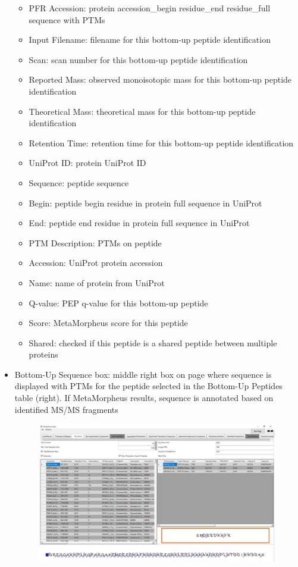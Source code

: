 \begin{itemize}
\begin{figure}[h]
\end{figure}
	\begin{itemize}
		\item PFR Accession: protein accession\_begin residue\_end residue\_full sequence with PTMs
		\item Input Filename: filename for this bottom-up peptide identification
		\item Scan: scan number for this bottom-up peptide identification
		\item Reported Mass: observed monoisotopic mass for this bottom-up peptide identification
		\item Theoretical Mass: theoretical mass for this bottom-up peptide identification
		\item Retention Time: retention time for this bottom-up peptide identification
		\item UniProt ID: protein UniProt ID
		\item Sequence: peptide sequence
		\item Begin: peptide begin residue in protein full sequence in UniProt
		\item End: peptide end residue in protein full sequence in UniProt
		\item PTM Description: PTMs on peptide
		\item Accession: UniProt protein accession
		\item Name: name of protein from UniProt
		\item Q-value: PEP q-value for this bottom-up peptide
		\item Score: MetaMorpheus score for this peptide
		\item Shared: checked if this peptide is a shared peptide between multiple proteins
	\end{itemize}
	\item Bottom-Up Sequence box: middle right box on page where sequence is displayed with PTMs for the peptide selected in the Bottom-Up Peptides table (right). If MetaMorpheus results, sequence is annotated based on identified MS/MS fragments
	\begin{figure}[h]
\centering
\includegraphics[scale=0.42]{figures/topdown6.jpg}
\end{figure}
\end{itemize}